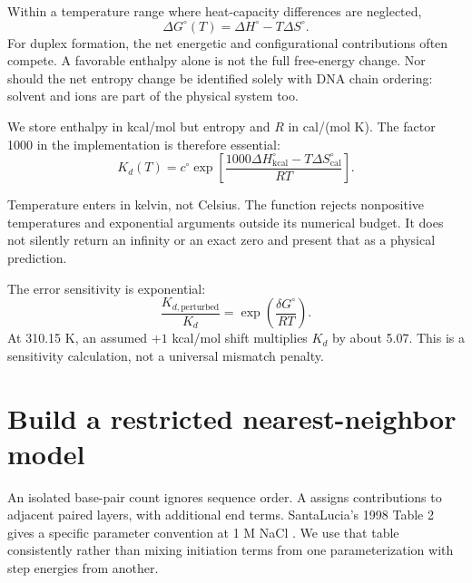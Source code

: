 Within a temperature range where heat-capacity differences are neglected,
\begin{equation}
\Delta G^\circ(T)=\Delta H^\circ-T\Delta S^\circ.
\label{eq:gibbs}
\end{equation}
For duplex formation, the net energetic and configurational contributions
often compete. A favorable enthalpy alone is not the full free-energy change.
Nor should the net entropy change be identified solely with DNA chain
ordering: solvent and ions are part of the physical system too.


We store enthalpy in kcal/mol but entropy and $R$ in cal/(mol K).
The factor 1000 in the implementation is therefore essential:
\begin{equation}
K_d(T)=c^\circ\exp\left[
\frac{1000\Delta H^\circ_{\mathrm{kcal}}-T\Delta S^\circ_{\mathrm{cal}}}
{RT}\right].
\end{equation}


Temperature enters in kelvin, not Celsius. The function rejects nonpositive
temperatures and exponential arguments outside its numerical budget.
It does not silently return an infinity or an exact zero and present that
as a physical prediction.

The error sensitivity is exponential:
\begin{equation}
\frac{K_{d,\mathrm{perturbed}}}{K_d}
=\exp\left(\frac{\delta G^\circ}{RT}\right).
\end{equation}
At 310.15 K, an assumed $+1$ kcal/mol shift multiplies $K_d$ by about 5.07.
This is a sensitivity calculation, not a universal mismatch penalty.

\section{Build a restricted nearest-neighbor model}

An isolated base-pair count ignores sequence order. A
 assigns contributions to adjacent paired
layers, with additional end terms. SantaLucia's 1998 Table 2 gives a
specific parameter convention at 1 M NaCl \cite{SantaLucia1998}.
We use that table consistently rather than mixing initiation terms from
one parameterization with step energies from another.

